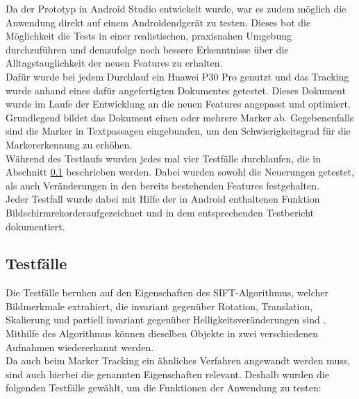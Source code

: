 Da der Prototyp in Android Studio entwickelt wurde, war es zudem möglich die Anwendung direkt auf einem Androidendgerät zu testen. Dieses bot die Möglichkeit die Tests in einer realistischen, praxisnahen Umgebung durchzuführen und demzufolge noch bessere Erkenntnisse über die Alltagstauglichkeit der neuen Features zu erhalten.  \\
Dafür wurde bei jedem Durchlauf ein Huawei P30 Pro genutzt und das Tracking wurde anhand eines dafür angefertigten Dokumentes  getestet. Dieses Dokument wurde im Laufe der Entwicklung an die neuen Features angepasst und optimiert. Grundlegend bildet das Dokument einen oder mehrere Marker ab. Gegebenenfalls sind die Marker in Textpassagen eingebunden, um den Schwierigkeitsgrad für die Markererkennung zu erhöhen.\\
Während des Testlaufs wurden jedes mal vier Testfälle durchlaufen, die in Abschnitt \ref{sec:Testfälle} beschrieben werden. Dabei wurden sowohl die Neuerungen getestet, als auch Veränderungen in den bereits bestehenden Features festgehalten.\\
Jeder Testfall wurde dabei mit Hilfe der in Android enthaltenen Funktion \glqq Bildschirmrekorder\grqq aufgezeichnet und in dem entsprechenden Testbericht dokumentiert.


\subsection{Testfälle}\label{sec:Testfälle}
Die Testfälle beruhen auf den Eigenschaften des SIFT-Algorithmus, welcher Bildmerkmale extrahiert, die invariant gegenüber Rotation, Translation, Skalierung und partiell invariant gegenüber Helligkeitsveränderungen sind \citep[S. 345]{nischwitz:bildverarbeitung}. Mithilfe des Algorithmus können dieselben Objekte in zwei verschiedenen Aufnahmen wiedererkannt werden.\\
Da auch beim Marker Tracking ein ähnliches Verfahren angewandt werden muss, sind auch hierbei die genannten Eigenschaften relevant. Deshalb wurden die folgenden Testfälle gewählt, um die Funktionen der Anwendung zu testen:

